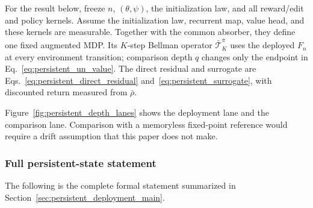 \documentclass{article}
\theoremstyle{plain}
\theoremstyle{definition}
\theoremstyle{remark}
\begin{document}
For the result below, freeze $n$, $(\theta,\psi)$, the initialization law,
and all reward/edit and policy kernels. Assume the initialization law,
recurrent map, value head, and these kernels are measurable. Together with
the common absorber, they define one fixed augmented MDP. Its $K$-step
Bellman operator $\bar{\mathcal T}^{\bar\pi}_K$ uses the deployed $F_n$ at
every environment transition; comparison depth $q$ changes only the endpoint in
Eq.~\eqref{eq:persistent_un_value}. The direct residual and surrogate are
Eqs.~\eqref{eq:persistent_direct_residual} and~\eqref{eq:persistent_surrogate},
with discounted return measured from $\bar\rho$.

Figure~\ref{fig:persistent_depth_lanes} shows the deployment lane and the
comparison lane.
Comparison with a memoryless fixed-point reference would require a drift
assumption that this paper does not make.

\subsubsection{Full persistent-state statement}

The following is the complete formal statement summarized in
Section~\ref{sec:persistent_deployment_main}.
\end{document}
